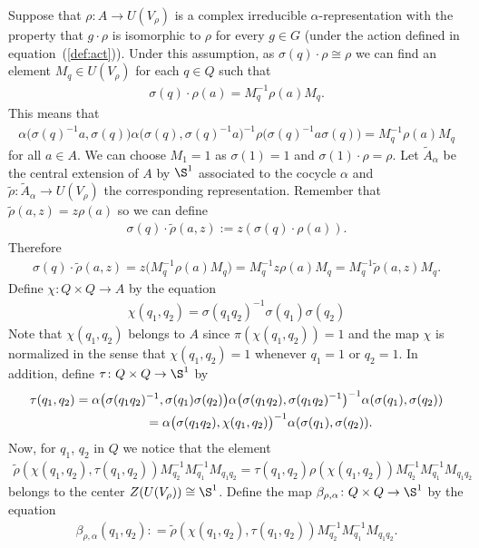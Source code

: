 Suppose that $\rho\colon A \rightarrow U(V_{\rho})$ is a complex irreducible $\alpha$-representation
with the property that $g\cdot \rho$ is isomorphic to $\rho$ for every $g\in G$
(under the action defined in equation~(\ref{def:act})). Under this assumption,
as $\sigma(q)\cdot \rho\cong\rho$
we can find an element $M_{q}\in
U(V_{\rho})$ for each $q \in Q$ such that
\begin{gather*}%
	\sigma(q)\cdot \rho(a)=M_{q}^{-1}\rho(a)M_{q}.
\end{gather*}
This means that
\begin{gather*}
\alpha\big(\sigma(q)^{-1}a,\sigma(q)\big)\alpha\big(\sigma(q),\sigma(q)^{-1}a\big)^{-1}
\rho\big(\sigma(q)^{-1}a\sigma(q)\big)=M_{q}^{-1}\rho(a)M_{q}
\end{gather*}
for all $a\in A$. We can choose $M_{1} = 1$ as $\sigma(1)=1$ and $\sigma(1)\cdot\rho=\rho$.
Let $\widetilde{A}_{\alpha}$ be the central extension of $A$ by $\S^{1}$
associated to the cocycle $\alpha$ and $\tilde{\rho}\colon \widetilde{A}_{\alpha}\to U(V_{\rho})$ the
corresponding representation. Remember that $\tilde{\rho}(a,z)=z\rho(a)$ so we can define
\begin{gather*}
\sigma(q)\cdot \tilde{\rho}(a,z):=z (\sigma(q)\cdot \rho(a)).
\end{gather*}
Therefore
\begin{gather*}%
\sigma(q)\cdot \tilde{\rho}(a,z)=z\big(M_{q}^{-1}\rho(a)M_{q}\big)
=M_{q}^{-1}z\rho(a)M_{q}=M_{q}^{-1}\tilde{\rho}(a,z)M_{q}.
\end{gather*}
Define $\chi\colon Q\times Q \rightarrow A$ by the equation
\begin{gather*}
\chi(q_{1},q_{2})=\sigma(q_{1}q_{2})^{-1}\sigma(q_{1})\sigma(q_{2})%
\end{gather*}
Note that $\chi(q_{1},q_{2})$ belongs to $A$ since
$\pi(\chi(q_{1},q_{2}))=1$ and the map $\chi$ is normalized in
the sense that $\chi(q_{1},q_{2})=1$ whenever $q_{1}=1$ or
$q_{2}=1$. In addition, define $\tau\colon Q\times Q\rightarrow \S^{1}$ by
\begin{gather*}
\tau(q_{1},q_{2})=\alpha\big(\sigma(q_{1}q_{2})^{-1},\sigma(q_{1})\sigma(q_{2})\big)
\alpha\big(\sigma(q_{1}q_{2}),\sigma(q_{1}q_{2})^{-1}\big)^{-1}\alpha(\sigma(q_{1}),\sigma(q_{2}))\nonumber
\\ \hphantom{\tau(q_{1},q_{2})}
{}=\alpha\big(\sigma(q_{1}q_{2}),\chi(q_{1},q_{2})\big)^{-1}\alpha(\sigma(q_{1}),\sigma(q_{2})).
\end{gather*}
Now, for $q_{1}$, $q_{2}$ in $Q$ we notice that the element
\begin{gather*}
\tilde{\rho}(\chi(q_{1},q_{2}),\tau(q_{1},q_{2}))M_{q_{2}}^{-1}M_{q_{1}}^{-1}M_{q_{1}q_{2}}
=\tau(q_{1},q_{2})\rho(\chi(q_{1},q_{2}))M_{q_{2}}^{-1}M_{q_{1}}^{-1}
M_{q_{1}q_{2}}
\end{gather*}
belongs to the center $Z(U(V_{\rho}))\cong \S^{1}$. Define the map
$\beta_{\rho,\alpha}\colon Q\times Q \rightarrow
\S^{1}$ by the equation
\begin{gather}
\label{defQbeta}
\beta_{\rho,\alpha}(q_{1},q_{2}):
=\tilde{\rho}(\chi(q_{1},q_{2}),\tau(q_{1},q_{2}))M_{q_{2}}^{-1}M_{q_{1}}^{-1}M_{q_{1}q_{2}}.
\end{gather}


